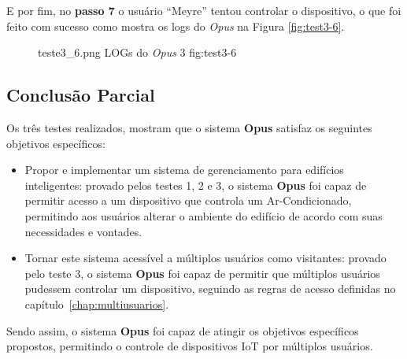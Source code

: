 E por fim, no \textbf{passo 7} o usuário ``Meyre'' tentou controlar o dispositivo, o que foi feito com sucesso como mostra os logs do \emph{Opus}
na Figura \ref{fig:test3-6}.

\begin{figure}[h!]
    {teste3_6.png}
    {LOGs do \emph{Opus} 3}
    {fig:test3-6}
\end{figure}

\subsection{Conclusão Parcial}

Os três testes realizados, mostram que o sistema \textbf{Opus} satisfaz os seguintes objetivos específicos:
\begin{itemize}
    \item Propor e implementar um sistema de gerenciamento para edifícios inteligentes:
        provado pelos testes 1, 2 e 3, o sistema \textbf{Opus} foi capaz de permitir acesso a um
        dispositivo que controla um Ar-Condicionado, permitindo aos usuários alterar o ambiente do 
        edifício de acordo com suas necessidades e vontades.
    \item Tornar este sistema acessível a múltiplos usuários como visitantes:
        provado pelo teste 3, o sistema \textbf{Opus} foi capaz de permitir que múltiplos usuários
        pudessem controlar um dispositivo, seguindo as regras de acesso definidas no capítulo~\ref{chap:multiusuarios}.
\end{itemize}

Sendo assim, o sistema \textbf{Opus} foi capaz de atingir os objetivos específicos propostos, 
permitindo o controle de dispositivos IoT por múltiplos usuários.
